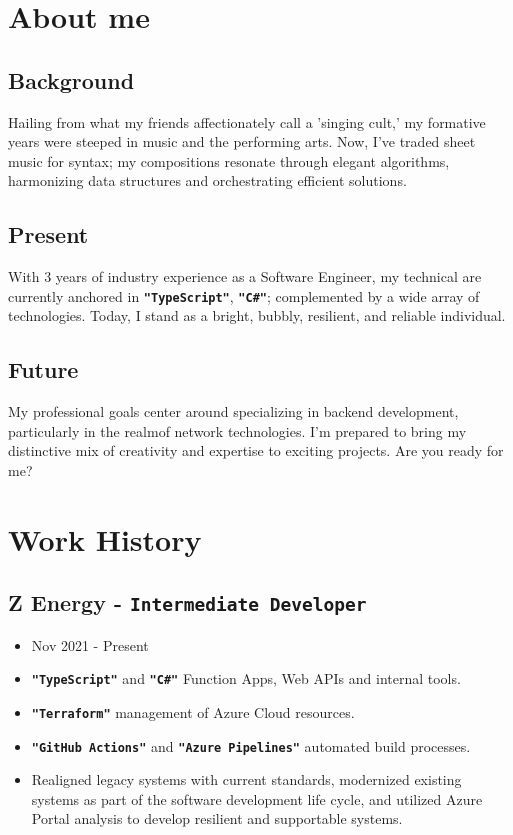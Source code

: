\documentclass[a4paper, 10pt]{article}
\newcommand{\code}[1]{\textcolor{code}{\textbf{\texttt{"#1"}}}}
\begin{document}
\begin{multicols*}{2}
	\section{About me}
	\subsection{Background}
	Hailing from what my friends affectionately call a 'singing cult,' my formative years were steeped in music and the performing arts. Now, I've traded sheet music for syntax; my compositions resonate through elegant algorithms, harmonizing data structures and orchestrating efficient solutions.
	\subsection{Present}
	With 3 years of industry experience as a Software Engineer, my technical are currently anchored in \code{TypeScript}, \code{C\#}; complemented by a wide array of technologies. Today, I stand as a bright, bubbly, resilient, and reliable individual.
	\subsection{Future}
	My professional goals center around specializing in backend development, particularly in the realmof network technologies. I'm prepared to bring my distinctive mix of creativity and expertise to exciting projects. Are you ready for me?

	\vfill\null
	\columnbreak

	\section{Work History}
	\subsection{Z Energy - \texttt{Intermediate Developer}}
	\begin{itemize}[itemsep=0pt, leftmargin=0pt]
		\item Nov 2021 - Present
		\item \code{TypeScript} and \code{C\#} Function Apps, Web APIs and internal tools.
		\item \code{Terraform} management of Azure Cloud resources.
		\item \code{GitHub Actions} and \code{Azure Pipelines} automated build processes.
		\item Realigned legacy systems with current standards, modernized existing systems as part of the software development life cycle, and utilized Azure Portal analysis to develop resilient and supportable systems.
	\end{itemize}

\end{multicols*}
\end{document}
